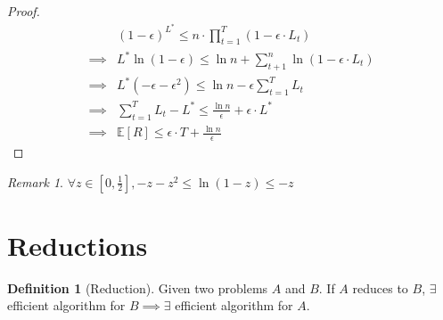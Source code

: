 \documentclass[11pt]{article}
\theoremstyle{definition}
\newtheorem{definition}{Definition}[section]
\theoremstyle{remark}
\newtheorem*{remark}{Remark}
\begin{document}
\begin{proof}
\begin{align*}
& (1-\epsilon)^{L^*} \leq n \cdot \prod_{t=1}^{T} (1 - \epsilon \cdot L_t) \\ 
\implies & L^* \ln (1-\epsilon) \leq \ln n + \sum _{t+1}^n \ln (1 - \epsilon \cdot L_t) \\
\implies & L^* (-\epsilon-\epsilon^2) \leq \ln n - \epsilon \sum_{t=1}^T L_t \\
\implies & \sum_{t=1}^T L_t - L^* \leq \frac{\ln n}{\epsilon} + \epsilon \cdot L^* \\
\implies & \mathbb{E}[R] \leq \epsilon \cdot T + \frac{\ln n}{\epsilon}
\end{align*}
\end{proof}

\begin{remark} $\forall z \in [0,\frac{1}{2}], -z-z^2 \leq \ln (1-z) \leq -z$
\end{remark}

\section{Reductions}
\begin{definition}[Reduction]
Given two problems $A$ and $B$. If $A$ reduces to $B$, $\exists$ efficient algorithm for $B \implies \exists$ efficient algorithm for $A$.
\end{definition}
\end{document}
